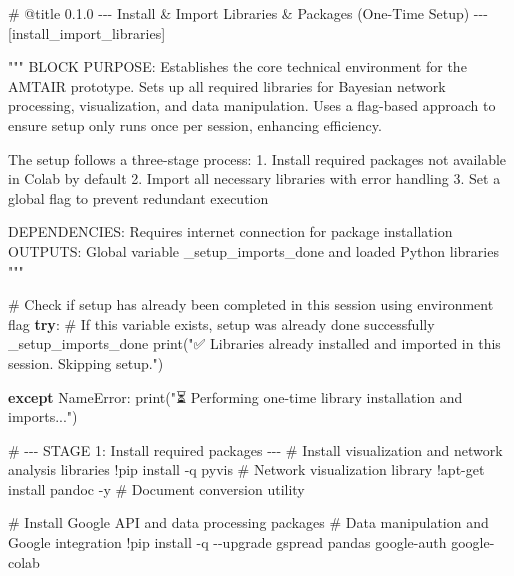 \documentclass[
  11pt,
  letterpaper,
]{book}
\newenvironment{Shaded}{\begin{snugshade}}{\end{snugshade}}
\newcommand{\BuiltInTok}[1]{\textcolor[rgb]{0.00,0.23,0.31}{#1}}
\newcommand{\CommentTok}[1]{\textcolor[rgb]{0.37,0.37,0.37}{#1}}
\newcommand{\ControlFlowTok}[1]{\textcolor[rgb]{0.00,0.23,0.31}{\textbf{#1}}}
\newcommand{\NormalTok}[1]{\textcolor[rgb]{0.00,0.23,0.31}{#1}}
\newcommand{\OperatorTok}[1]{\textcolor[rgb]{0.37,0.37,0.37}{#1}}
\newcommand{\PreprocessorTok}[1]{\textcolor[rgb]{0.68,0.00,0.00}{#1}}
\newcommand{\StringTok}[1]{\textcolor[rgb]{0.13,0.47,0.30}{#1}}
\begin{document}
\label{install_import_libraries}
\begin{Shaded}
\begin{Highlighting}[]
\CommentTok{\# @title 0.1.0 {-}{-}{-} Install \& Import Libraries \& Packages (One{-}Time Setup) {-}{-}{-} [install\_import\_libraries]}

\CommentTok{"""}
\CommentTok{BLOCK PURPOSE:}
\CommentTok{Establishes the core technical environment for the AMTAIR prototype.}
\CommentTok{Sets up all required libraries for Bayesian network processing, visualization,}
\CommentTok{and data manipulation.}
\CommentTok{Uses a flag{-}based approach to ensure setup only runs once per session,}
\CommentTok{enhancing efficiency.}

\CommentTok{The setup follows a three{-}stage process:}
\CommentTok{1. Install required packages not available in Colab by default}
\CommentTok{2. Import all necessary libraries with error handling}
\CommentTok{3. Set a global flag to prevent redundant execution}

\CommentTok{DEPENDENCIES: Requires internet connection for package installation}
\CommentTok{OUTPUTS: Global variable \_setup\_imports\_done and loaded Python libraries}
\CommentTok{"""}

\CommentTok{\# Check if setup has already been completed in this session using environment flag}
\ControlFlowTok{try}\NormalTok{:}
    \CommentTok{\# If this variable exists, setup was already done successfully}
\NormalTok{    \_setup\_imports\_done}
    \BuiltInTok{print}\NormalTok{(}\StringTok{"✅ Libraries already installed and imported in this session. Skipping setup."}\NormalTok{)}

\ControlFlowTok{except} \PreprocessorTok{NameError}\NormalTok{:}
    \BuiltInTok{print}\NormalTok{(}\StringTok{"⏳ Performing one{-}time library installation and imports..."}\NormalTok{)}

    \CommentTok{\# {-}{-}{-} STAGE 1: Install required packages {-}{-}{-}}
    \CommentTok{\# Install visualization and network analysis libraries}
    \OperatorTok{!}\NormalTok{pip install }\OperatorTok{{-}}\NormalTok{q pyvis  }\CommentTok{\# Network visualization library}
    \OperatorTok{!}\NormalTok{apt}\OperatorTok{{-}}\NormalTok{get install pandoc }\OperatorTok{{-}}\NormalTok{y  }\CommentTok{\# Document conversion utility}

    \CommentTok{\# Install Google API and data processing packages}
    \CommentTok{\# Data manipulation and Google integration}
    \OperatorTok{!}\NormalTok{pip install }\OperatorTok{{-}}\NormalTok{q }\OperatorTok{{-}{-}}\NormalTok{upgrade gspread pandas google}\OperatorTok{{-}}\NormalTok{auth google}\OperatorTok{{-}}\NormalTok{colab}


\end{Highlighting}
\end{Shaded}
\end{document}
